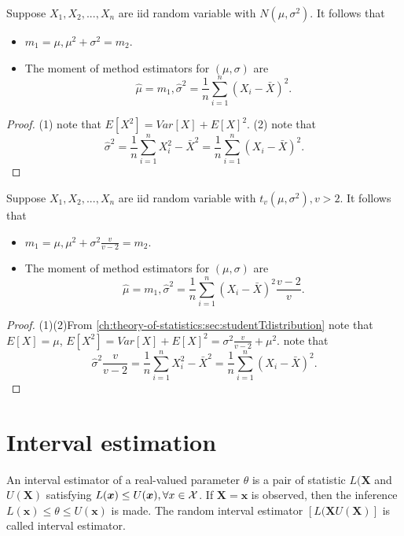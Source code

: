 \begin{refsection}
\begin{lemma}\cite[312]{casella2002statistical}
Suppose $X_1,X_2,...,X_n$ are iid random variable with $N(\mu, \sigma^2)$. It follows that
\begin{itemize}
	\item $m_1 = \mu, \mu^2 + \sigma^2 = m_2$.
	\item The moment of method estimators for $(\mu, \sigma)$ are
	$$\hat{\mu} = m_1, \hat{\sigma}^2 = \frac{1}{n}\sum_{i=1}^n (X_i - \bar{X})^2.$$
\end{itemize}	
\end{lemma}
\begin{proof}
(1) note that $E[X^2] = Var[X] + E[X]^2$.
(2) note that 
$$\hat{\sigma}^2 = \frac{1}{n}\sum_{i=1}^n X_i^2 - \bar{X}^2 = \frac{1}{n}\sum_{i=1}^n (X_i - \bar{X})^2.$$
\end{proof}



\begin{lemma}\label{ch:theory-of-statistics:th:methodOfMomentsStudentTEstimation}
Suppose $X_1,X_2,...,X_n$ are iid random variable with $t_v(\mu, \sigma^2),v > 2$. It follows that
\begin{itemize}
	\item $m_1 = \mu, \mu^2 + \sigma^2\frac{v}{v-2} = m_2$.
	\item The moment of method estimators for $(\mu, \sigma)$ are
	$$\hat{\mu} = m_1, \hat{\sigma}^2 = \frac{1}{n}\sum_{i=1}^n (X_i - \bar{X})^2 \frac{v-2}{v}.$$
\end{itemize}		
	
\end{lemma}
\begin{proof}
(1)(2)From \autoref{ch:theory-of-statistics:sec:studentTdistribution} note that $E[X] = \mu$, $E[X^2] = Var[X] + E[X]^2 = \sigma^2\frac{v}{v-2} + \mu^2$.
note that 
$$\hat{\sigma}^2\frac{v}{v-2} = \frac{1}{n}\sum_{i=1}^n X_i^2 - \bar{X}^2 = \frac{1}{n}\sum_{i=1}^n (X_i - \bar{X})^2.$$
\end{proof}




\section{Interval estimation}
\begin{definition}
	\cite[418]{casella2002statistical}
	An interval estimator of a real-valued parameter $\theta$ is a pair of statistic $L(\bm{X}$ and $U(\bm{X})$ satisfying $L(\bm{x}) \leq U(\bm{x}),\forall x\in \mathcal{X}$. If $\bm{X}=\bm{x}$ is observed, then the inference $L(\bm{x}) \leq\theta \leq U(\bm{x})$ is made. The random interval estimator $[L(\bm{X} U(\bm{X})]$ is called interval estimator.  
\end{definition}


\end{refsection}
